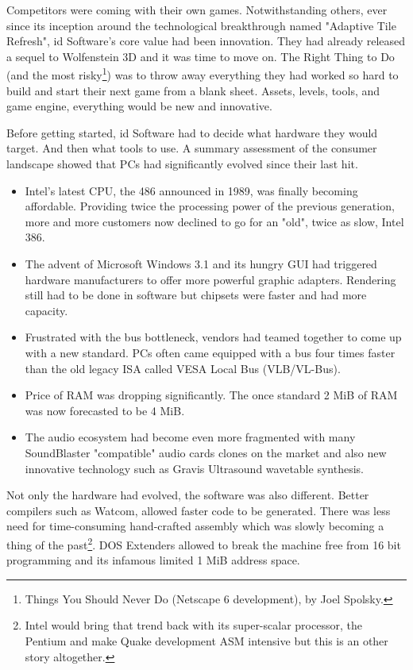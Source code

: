 Competitors were coming with their own games. Notwithstanding others, ever since its inception around the technological breakthrough named "Adaptive Tile Refresh", id Software's core value had been innovation. They had already released a sequel to Wolfenstein 3D and it was time to move on. The Right Thing to Do (and the most risky\footnote{Things You Should Never Do (Netscape 6 development), by Joel Spolsky.}) was to throw away everything they had worked so hard to build and start their next game from a blank sheet. Assets, levels, tools, and game engine, everything would be new and innovative.\\
\par
Before getting started, id Software had to decide what hardware they would target. And then what tools to use. A summary assessment of the consumer landscape showed that PCs had significantly evolved since their last hit.
\begin{itemize}
\item Intel's latest CPU, the 486 announced in 1989, was finally becoming affordable. Providing twice the processing power of the previous generation, more and more customers now declined to go for an "old", twice as slow, Intel 386. 
\item The advent of Microsoft Windows 3.1 and its hungry GUI had triggered hardware manufacturers to offer more powerful graphic adapters. Rendering  still had to be done in software but chipsets were faster and had more capacity.
\item Frustrated with the bus bottleneck, vendors had teamed together to come up with a new standard. PCs often came equipped with a bus four times faster than the old legacy ISA called VESA Local Bus (VLB/VL-Bus). 
\item Price of RAM was dropping significantly. The once standard 2 MiB of RAM was now forecasted to be 4 MiB. 
\item The audio ecosystem had become even more fragmented with many SoundBlaster "compatible" audio cards clones on the market and also new innovative technology such as Gravis Ultrasound wavetable synthesis.\\
\end{itemize}
 \par 
 Not only the hardware had evolved, the software was also different. Better compilers such as Watcom, allowed faster code to be generated. There was less need for time-consuming hand-crafted assembly which was slowly becoming a thing of the past\footnote{Intel would bring that trend back with its super-scalar processor, the Pentium and make Quake development ASM intensive but this is an other story altogether.}. DOS Extenders allowed to break the machine free from 16 bit programming and its infamous limited 1 MiB address space.\\
